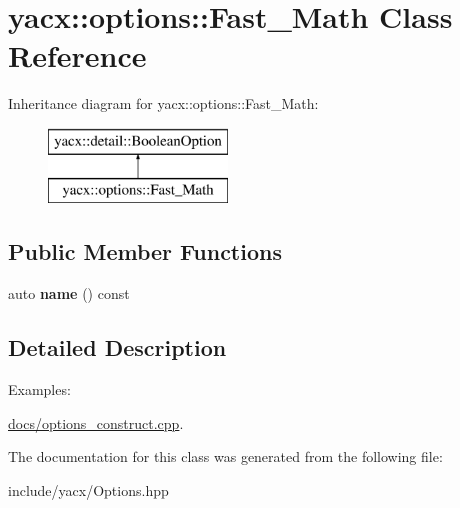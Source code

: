 \hypertarget{classyacx_1_1options_1_1_fast___math}{}\section{yacx\+:\+:options\+:\+:Fast\+\_\+\+Math Class Reference}
\label{classyacx_1_1options_1_1_fast___math}
Inheritance diagram for yacx\+:\+:options\+:\+:Fast\+\_\+\+Math\+:\begin{figure}[H]
\begin{center}
\leavevmode
\includegraphics[height=2.000000cm]{classyacx_1_1options_1_1_fast___math}
\end{center}
\end{figure}
\subsection*{Public Member Functions}
\begin{DoxyCompactItemize}
\item 
\mbox{\label{classyacx_1_1options_1_1_fast___math_ada740b2423739e7bda34770a529d5d91}} 
auto {\bfseries name} () const
\end{DoxyCompactItemize}


\subsection{Detailed Description}
\begin{Desc}
\item[Examples\+: ]\par
\hyperlink{docs_2options_construct_8cpp-example}{docs/options\+\_\+construct.\+cpp}.\end{Desc}


The documentation for this class was generated from the following file\+:\begin{DoxyCompactItemize}
\item 
include/yacx/Options.\+hpp\end{DoxyCompactItemize}
